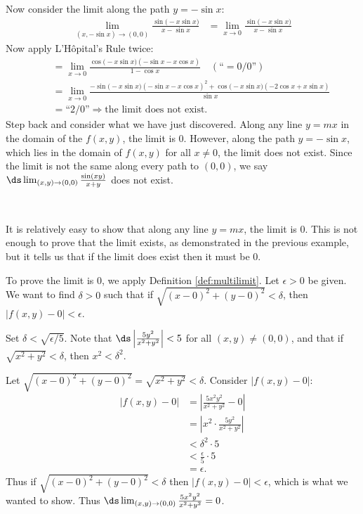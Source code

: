 {\begin{enumerate}
	Now consider the limit along the path $y=-\sin x$:
	\begin{align*}
	\lim_{(x,-\sin x)\to (0,0)} \frac{\sin\big(-x\sin x\big)}{x-\sin x} &= \lim_{x\to0} \frac{\sin\big(-x\sin x\big)}{x-\sin x}
	\end{align*}
	Now apply L'H\^opital's Rule twice:
	\small
	\begin{align*}
	 \quad &= \lim_{x\to 0}\frac{\cos\big(-x\sin x\big)(-\sin x-x\cos x)}{1-\cos x} \quad \left(\text{``}= 0/0\text{''}\right)\\
	&= \lim_{x\to 0}\frac{-\sin\big(-x\sin x\big)(-\sin x-x\cos x)^2+\cos\big(-x\sin x\big)(-2\cos x+x\sin x)}{\sin x}\\
	&= \text{``2/0''} \Rightarrow \text{the limit does not exist.}
	\end{align*}
	\normalsize
Step back and consider what we have just discovered. Along any line $y=mx$ in the domain of the $f(x,y)$, the limit is 0. However, along the path $y=-\sin x$, which lies in the domain of  $f(x,y)$ for all $x\neq 0$, the limit does not exist. Since the limit is not the same along every path to $(0,0)$, we say $\ds \lim_{(x,y)\to (0,0)}\frac{\sin(xy)}{x+y}$ does not exist.
\end{enumerate}
\baselineskip
}\\

{It is relatively easy to show that along any line $y=mx$, the limit is 0. This is not enough to prove that the limit exists, as demonstrated in the previous example, but it tells us that if the limit does exist then it must be 0.

To prove the limit is 0, we apply Definition \ref{def:multilimit}. Let $\epsilon >0$ be given. We want to find $\delta >0$ such that if $\sqrt{(x-0)^2+(y-0)^2} <\delta$, then $|f(x,y)-0| <\epsilon$.

Set $\delta < \sqrt{\epsilon/5}$. Note that $\ds \left|\frac{5y^2}{x^2+y^2}\right| <5$ for all $(x,y)\neq (0,0)$, and that if $\sqrt{x^2+y^2} <\delta$, then $x^2<\delta^2$.

Let $\sqrt{(x-0)^2+(y-0)^2} = \sqrt{x^2+y^2}<\delta$. Consider $|f(x,y)-0|$:
\begin{align*}
|f(x,y)-0| &= \left|\frac{5x^2y^2}{x^2+y^2}-0\right| \\
				&= \left|x^2\cdot\frac{5y^2}{x^2+y^2}\right|\\
				&< \delta^2\cdot 5 \\
				&< \frac{\epsilon}{5}\cdot 5 \\
				&= \epsilon.
\end{align*}
Thus if $\sqrt{(x-0)^2+(y-0)^2}<\delta$ then $|f(x,y)-0|<\epsilon$, which is what we wanted to show. Thus $\ds \lim_{(x,y)\to(0,0)} \frac{5x^2y^2}{x^2+y^2} = 0$.
}\\

